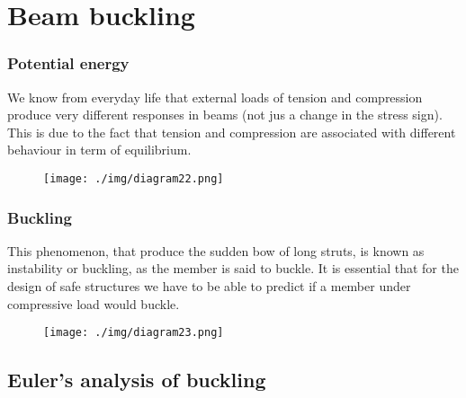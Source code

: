 \chapter{Beam buckling}
\subsection*{Potential energy}
We know from everyday life that external loads of tension and compression produce very different responses in beams (not jus a change in the stress sign). This is due to the fact that tension and compression are associated with different behaviour in term of equilibrium.
\begin{figure}[H]
  \centering
  \texttt{[image: ./img/diagram22.png]}
  \caption{}
\end{figure}
\subsection*{Buckling}
This phenomenon, that produce the sudden bow of long struts, is known as instability or buckling, as the member is said to buckle. It is essential that for the design of safe structures we have to be able to predict if a member under compressive load would buckle.
\begin{figure}[H]
  \centering
  \texttt{[image: ./img/diagram23.png]}
  \caption{}
\end{figure}
\section{Euler's analysis of buckling}

